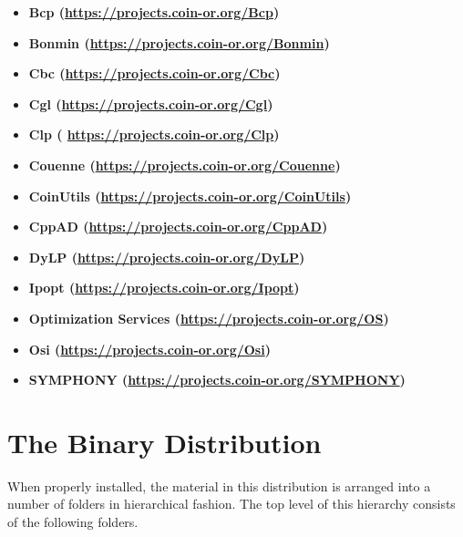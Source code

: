 \documentclass[11pt]{article}
\renewcommand{\{}{{\char"7B}}
\renewcommand{\}}{{\char"7D}}
\renewcommand{\^}{{\char"0D}}
\renewcommand{\'}{{\char"0D}}
\begin{document}
\begin{itemize}
\item[] {\bf Bcp (\url{https://projects.coin-or.org/Bcp}) }
\item[] {\bf Bonmin  (\url{https://projects.coin-or.org/Bonmin})}
\item[] {\bf Cbc (\url{https://projects.coin-or.org/Cbc})}
\item[] {\bf Cgl  (\url{https://projects.coin-or.org/Cgl})}
\item[] {\bf Clp ( \url{https://projects.coin-or.org/Clp})}
\item[] {\bf Couenne (\url{https://projects.coin-or.org/Couenne})}
\item[] {\bf CoinUtils (\url{https://projects.coin-or.org/CoinUtils})}
\item[] {\bf CppAD (\url{https://projects.coin-or.org/CppAD})}
\item[] {\bf DyLP (\url{https://projects.coin-or.org/DyLP})}
\item[] {\bf Ipopt  (\url{https://projects.coin-or.org/Ipopt})}
\item[] {\bf Optimization Services (\url{https://projects.coin-or.org/OS}) }
\item[] {\bf Osi (\url{https://projects.coin-or.org/Osi})}
\item[] {\bf SYMPHONY (\url{https://projects.coin-or.org/SYMPHONY})}
\end{itemize}


\section{The Binary Distribution}\label{section:distribution}

When properly installed, the material in this distribution is arranged into a number of folders
in hierarchical fashion. The top level of this hierarchy consists of the following folders.
\end{document}
